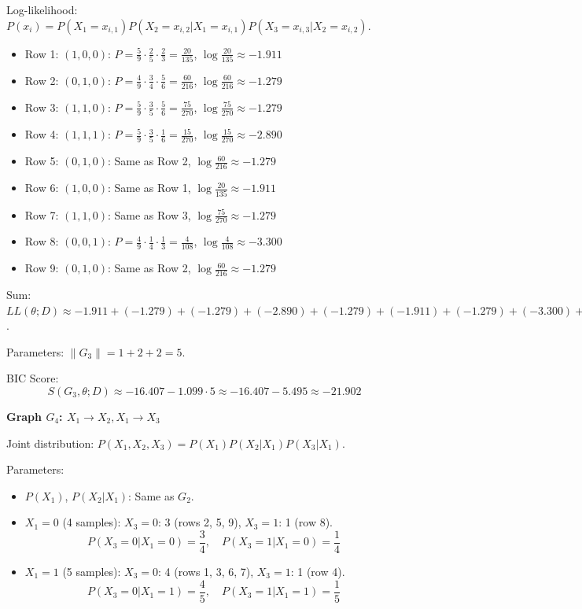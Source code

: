 \documentclass[a3paper,12pt]{extarticle} %
\begin{document}
Log-likelihood: \(P(x_i) = P(X_1 = x_{i,1}) P(X_2 = x_{i,2} | X_1 = x_{i,1}) P(X_3 = x_{i,3} | X_2 = x_{i,2})\).
\begin{itemize}
    \item Row 1: \((1,0,0)\): \(P = \frac{5}{9} \cdot \frac{2}{5} \cdot \frac{2}{3} = \frac{20}{135}\), \(\log \frac{20}{135} \approx -1.911\)
    \item Row 2: \((0,1,0)\): \(P = \frac{4}{9} \cdot \frac{3}{4} \cdot \frac{5}{6} = \frac{60}{216}\), \(\log \frac{60}{216} \approx -1.279\)
    \item Row 3: \((1,1,0)\): \(P = \frac{5}{9} \cdot \frac{3}{5} \cdot \frac{5}{6} = \frac{75}{270}\), \(\log \frac{75}{270} \approx -1.279\)
    \item Row 4: \((1,1,1)\): \(P = \frac{5}{9} \cdot \frac{3}{5} \cdot \frac{1}{6} = \frac{15}{270}\), \(\log \frac{15}{270} \approx -2.890\)
    \item Row 5: \((0,1,0)\): Same as Row 2, \(\log \frac{60}{216} \approx -1.279\)
    \item Row 6: \((1,0,0)\): Same as Row 1, \(\log \frac{20}{135} \approx -1.911\)
    \item Row 7: \((1,1,0)\): Same as Row 3, \(\log \frac{75}{270} \approx -1.279\)
    \item Row 8: \((0,0,1)\): \(P = \frac{4}{9} \cdot \frac{1}{4} \cdot \frac{1}{3} = \frac{4}{108}\), \(\log \frac{4}{108} \approx -3.300\)
    \item Row 9: \((0,1,0)\): Same as Row 2, \(\log \frac{60}{216} \approx -1.279\)
\end{itemize}
Sum: \(LL(\theta; D) \approx -1.911 + (-1.279) + (-1.279) + (-2.890) + (-1.279) + (-1.911) + (-1.279) + (-3.300) + (-1.279) \approx -16.407\).

Parameters: \(\|G_3\| = 1 + 2 + 2 = 5\).

BIC Score:
\[
S(G_3, \theta; D) \approx -16.407 - 1.099 \cdot 5 \approx -16.407 - 5.495 \approx -21.902
\]

\textbf{Graph \(G_4\): \(X_1 \to X_2, X_1 \to X_3\)}

Joint distribution: \(P(X_1, X_2, X_3) = P(X_1)P(X_2 | X_1)P(X_3 | X_1)\).

Parameters:
\begin{itemize}
    \item \(P(X_1)\), \(P(X_2 | X_1)\): Same as \(G_2\).
    \item \(X_1 = 0\) (4 samples): \(X_3 = 0\): 3 (rows 2, 5, 9), \(X_3 = 1\): 1 (row 8).
    \[
    P(X_3 = 0 | X_1 = 0) = \frac{3}{4}, \quad P(X_3 = 1 | X_1 = 0) = \frac{1}{4}
    \]
    \item \(X_1 = 1\) (5 samples): \(X_3 = 0\): 4 (rows 1, 3, 6, 7), \(X_3 = 1\): 1 (row 4).
    \[
    P(X_3 = 0 | X_1 = 1) = \frac{4}{5}, \quad P(X_3 = 1 | X_1 = 1) = \frac{1}{5}
    \]
\end{itemize}
\end{document}
